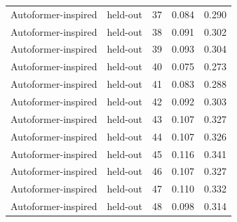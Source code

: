 \begin{tabular}{llrrr}
Autoformer-inspired & held-out & 37 & 0.084 & 0.290 \\
Autoformer-inspired & held-out & 38 & 0.091 & 0.302 \\
Autoformer-inspired & held-out & 39 & 0.093 & 0.304 \\
Autoformer-inspired & held-out & 40 & 0.075 & 0.273 \\
Autoformer-inspired & held-out & 41 & 0.083 & 0.288 \\
Autoformer-inspired & held-out & 42 & 0.092 & 0.303 \\
Autoformer-inspired & held-out & 43 & 0.107 & 0.327 \\
Autoformer-inspired & held-out & 44 & 0.107 & 0.326 \\
Autoformer-inspired & held-out & 45 & 0.116 & 0.341 \\
Autoformer-inspired & held-out & 46 & 0.107 & 0.327 \\
Autoformer-inspired & held-out & 47 & 0.110 & 0.332 \\
Autoformer-inspired & held-out & 48 & 0.098 & 0.314 \\
\bottomrule
\end{tabular}

